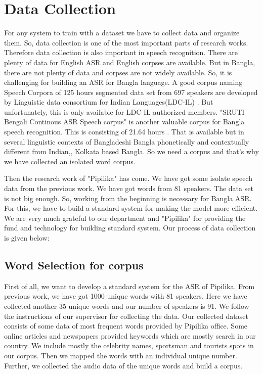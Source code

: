 \documentclass{standalone}
\begin{document}
\chapter{Data Collection}

For any system to train with a dataset we have to collect data and organize them. So, data collection is one of the most important parts of research works. Therefore data collection is also important in speech recognition. There are plenty of data for English ASR and English corpses are available. But in Bangla, there are not plenty of data and corpses are not widely available.
So, it is challenging for building an ASR for Bangla language. A good corpus naming Speech Corpora of 125 hours segmented data set from 697 speakers are developed by Linguistic data consortium for Indian Languages(LDC-IL) \cite{shrishrimal2012indian}. But unfortunately, this is only available for LDC-IL authorized members. "SRUTI Bengali Continous ASR Speech corpus" is another valuable corpus for Bangla speech recognition. This is consisting of 21.64 hours \cite{das2011bengali}. That is available but in several linguistic contexts of Bangladeshi Bangla phonetically and contextually different from Indian,, Kolkata based Bangla. So we need a corpus and that's why we have collected an isolated word corpus.

Then the research work of "Pipilika" has come. We have got some isolate speech data from the previous work. We have got words from 81 speakers. The data set is not big enough. So, working from the beginning is necessary for Bangla ASR. For this, we have to build a standard system for making the model more efficient. We are very much grateful to our department and "Pipilika" for providing the fund and technology for building standard system. Our process of data collection is given below:

\section{Word Selection for corpus}
First of all, we want to develop a standard system for the ASR of Pipilika. From previous work, we have got 1000 unique words with 81 speakers. Here we have collected another 35 unique words and our number of speakers is 91. We follow the instructions of our supervisor for collecting the data.
Our collected dataset consists of some data of most frequent words provided by Pipilika office. Some online articles and newspapers provided keywords which are mostly search in our country. We include mostly the celebrity names, sportsman and tourists spots in our corpus. Then we mapped the words with an individual unique number. Further, we collected the audio data of the unique words and build a corpus.
\end{document}
